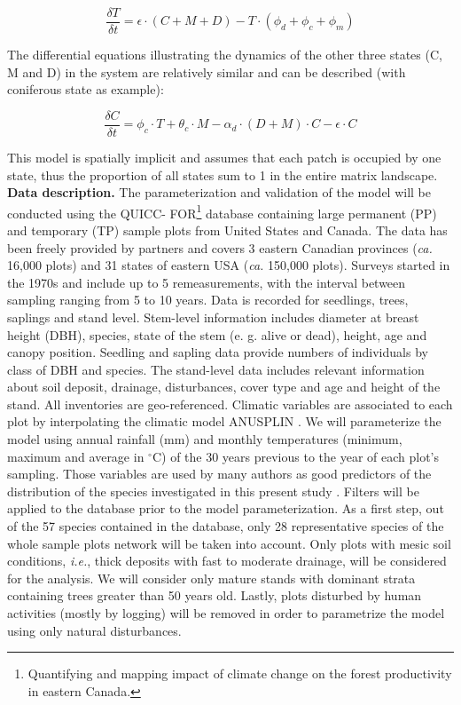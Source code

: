 \begin{equation}
 	\frac{\delta T}{\delta t} =\epsilon \cdot (C+M+D) - T \cdot (\phi_d + \phi_c + \phi_m)
\end{equation}

The differential equations illustrating the dynamics of the other three states
(C, M and D) in the system are relatively similar and can be described (with
coniferous state as example):

\begin{equation}
	\frac{\delta C}{\delta t} = \phi_c \cdot T + \theta_c \cdot M -\alpha_d \cdot (D+M)\cdot C - \epsilon \cdot C
\end{equation}

This model is spatially implicit and assumes that each patch is occupied by
one state, thus the proportion of all states sum to 1 in the entire matrix
landscape. \\

\textbf{Data description.} The parameterization and validation of the model
will be conducted using the QUICC- FOR\footnote{Quantifying and mapping impact
of climate change on the forest productivity in eastern Canada.} database
containing large permanent (PP) and temporary (TP) sample plots from United
States and Canada. The data has been freely provided by partners and covers 3
eastern Canadian provinces (\textit{ca.} 16,000 plots) and 31 states of
eastern USA (\textit{ca.} 150,000 plots). Surveys started in the 1970s and
include up to 5 remeasurements, with the interval between sampling ranging
from 5 to 10 years. Data is recorded for seedlings, trees, saplings and stand
level. Stem-level information includes diameter at breast height (DBH),
species, state of the stem (e. g. alive or dead), height, age and canopy
position. Seedling and sapling data provide numbers of individuals by class of
DBH and species. The stand-level data includes relevant information about soil
deposit, drainage, disturbances, cover type and age and height of the stand.
All  inventories are geo-referenced. Climatic variables are associated to each
plot by interpolating  the climatic model ANUSPLIN \cite{McKenney2011} . We
will parameterize the model using annual rainfall (mm) and monthly
temperatures (minimum, maximum and average in \ensuremath{^\circ}C) of the 30
years previous to the year of each plot's sampling. Those variables are used
by many authors as good predictors of the distribution of the species
investigated in this present study \cite{Goldblum2010}. Filters will be
applied to the database prior to the model parameterization. As a first step,
out of the 57 species contained in the database, only 28 representative
species of the whole sample plots network will be taken into account. Only
plots with mesic soil conditions, \textit{i.e.}, thick deposits with fast to
moderate drainage, will be considered for the analysis. We will consider only
mature stands with dominant strata containing trees greater than 50 years old.
Lastly, plots disturbed by human activities (mostly by logging) will be
removed in order to parametrize the model using only natural disturbances. \\


